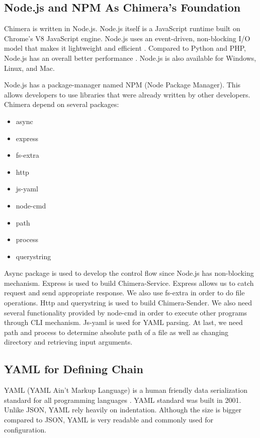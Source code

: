 \documentclass[conference]{IEEEtran}
\begin{document}
\subsection{Node.js and NPM As Chimera's Foundation}

Chimera is written in Node.js. Node.js itself is a JavaScript runtime built on Chrome's 
V8 JavaScript engine. Node.js uses an event-driven, non-blocking I/O model that makes it 
lightweight and efficient \cite{nodejs}. Compared to Python and PHP, Node.js has an 
overall better performance \cite{lei2014performance}. Node.js is also available for
Windows, Linux, and Mac.

Node.js has a package-manager named NPM (Node Package Manager). This allows developers
to use libraries that were already written by other developers. Chimera depend on 
several packages:

\begin{itemize}
    \item async
    \item express
    \item fs-extra
    \item http
    \item js-yaml
    \item node-cmd
    \item path
    \item process
    \item querystring
\end{itemize}

Async package is used to develop the control flow since Node.js has non-blocking
mechanism. Express is used to build Chimera-Service. Express allows us to catch request
and send appropriate response. We also use fs-extra in order to do file operations.
Http and querystring is used to build Chimera-Sender. We also need several functionality
provided by node-cmd in order to execute other programs through CLI mechanism.
Js-yaml is used for YAML parsing. At last, we need path and process to determine 
absolute path of a file as well as changing directory and retrieving input arguments.

\subsection{YAML for Defining Chain}

YAML (YAML Ain't Markup Language) is a human friendly data serialization standard for 
all programming languages \cite{yaml}. YAML standard was built in 2001. Unlike JSON,
YAML rely heavily on indentation. Although the size is bigger compared to JSON, YAML
is very readable and commonly used for configuration.
\end{document}
